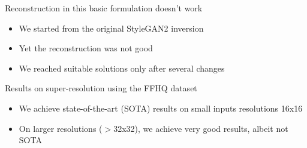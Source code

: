 \begin{frame}{Reconstruction in this basic formulation doesn't work}

\begin{itemize}
 \item We started from the original StyleGAN2 inversion
 
 \vo
 
 \item Yet the reconstruction was not good
 
 \vo
 
 \item We reached suitable solutions only after several changes 
 
 
\end{itemize}

\begin{center}
\vt
{}
\end{center}
 
\end{frame}

\begin{frame}{Results on super-resolution using the FFHQ dataset}

\begin{itemize}
 \item We achieve state-of-the-art (SOTA) results on small inputs resolutions 16x16
 \item On larger resolutions ($>$32x32), we achieve very good results, albeit not SOTA
\end{itemize}

\begin{center}
\vt
{}
\end{center}
 
\end{frame}

